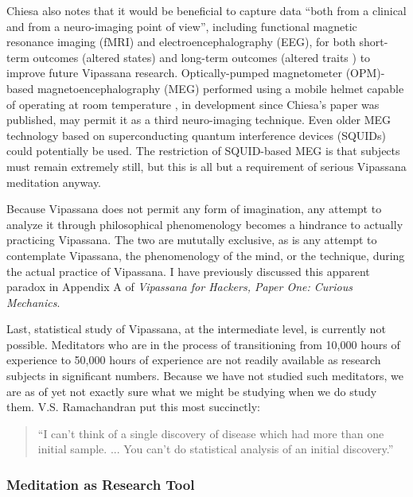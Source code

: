 \documentclass[a4paper, amsfonts, amssymb, amsmath, reprint, showkeys, nofootinbib, twoside]{revtex4-1}
\begin{document}
Chiesa also notes that it would be beneficial to capture data ``both from a clinical
and from a neuro-imaging point of view'', including functional magnetic resonance
imaging (fMRI) and electroencephalography (EEG), for both short-term outcomes
(altered states) and long-term outcomes (altered traits \cite{davidson1977role}) to
improve future Vipassana research. \cite{chiesa2010vipassana}
Optically-pumped magnetometer (OPM)-based magnetoencephalography (MEG) performed using a
mobile helmet capable of operating at room temperature \cite{boto2017new},
in development since Chiesa's
paper was published, may permit it as a third neuro-imaging technique. Even older MEG
technology based on superconducting quantum interference devices (SQUIDs) could
potentially be used. The restriction of SQUID-based MEG is that subjects must remain
extremely still, but this is all but a requirement of serious Vipassana meditation
anyway.

Because Vipassana does not permit any form of imagination, any attempt to analyze it
through philosophical phenomenology becomes a hindrance to actually practicing
Vipassana. \cite{patrik1994phenomenological} The two are mututally exclusive, as is
any attempt to contemplate Vipassana, the phenomenology of the mind, or the
technique, during the actual practice of Vipassana. I have previously discussed this
apparent paradox in Appendix A of
\textit{Vipassana for Hackers, Paper One: Curious Mechanics}.
\cite{deobald2017curious}

Last, statistical study of Vipassana, at the intermediate level, is currently not
possible. Meditators who are in the process of transitioning from 10,000 hours of
experience to 50,000 hours of experience are not readily available as research
subjects in significant numbers. Because we have not studied such meditators, we are
as of yet not exactly sure what we might be studying when we do study
them. V.S. Ramachandran put this most succinctly:

\begin{quotation}
  ``I can't think of a single discovery of disease which had more than one initial
  sample. ... You can't do statistical analysis of an initial discovery.''
  \cite{ramachandran2019relevance}
\end{quotation}

\subsubsection{Meditation as Research Tool}
\end{document}
